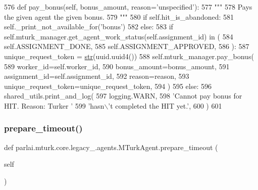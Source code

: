 \begin{DoxyCode}
576     \textcolor{keyword}{def }pay\_bonus(self, bonus\_amount, reason='unspecified'):
577         \textcolor{stringliteral}{"""}
578 \textcolor{stringliteral}{        Pays the given agent the given bonus.}
579 \textcolor{stringliteral}{        """}
580         \textcolor{keywordflow}{if} self.hit\_is\_abandoned:
581             self.\_print\_not\_available\_for(\textcolor{stringliteral}{'bonus'})
582         \textcolor{keywordflow}{else}:
583             \textcolor{keywordflow}{if} self.mturk\_manager.get\_agent\_work\_status(self.assignment\_id) \textcolor{keywordflow}{in} (
584                 self.ASSIGNMENT\_DONE,
585                 self.ASSIGNMENT\_APPROVED,
586             ):
587                 unique\_request\_token = \hyperlink{namespacegenerate__task__READMEs_a5b88452ffb87b78c8c85ececebafc09f}{str}(uuid.uuid4())
588                 self.mturk\_manager.pay\_bonus(
589                     worker\_id=self.worker\_id,
590                     bonus\_amount=bonus\_amount,
591                     assignment\_id=self.assignment\_id,
592                     reason=reason,
593                     unique\_request\_token=unique\_request\_token,
594                 )
595             \textcolor{keywordflow}{else}:
596                 shared\_utils.print\_and\_log(
597                     logging.WARN,
598                     \textcolor{stringliteral}{'Cannot pay bonus for HIT. Reason: Turker '}
599                     \textcolor{stringliteral}{'hasn\(\backslash\)'t completed the HIT yet.'},
600                 )
601 
\end{DoxyCode}
\mbox{\label{classparlai_1_1mturk_1_1core_1_1legacy__2018_1_1agents_1_1MTurkAgent_a8b3209004d4c83fdb11cacb82528e871}} 
\subsubsection{\texorpdfstring{prepare\+\_\+timeout()}{prepare\_timeout()}}
{\footnotesize\ttfamily def parlai.\+mturk.\+core.\+legacy\+\_.\+agents.\+M\+Turk\+Agent.\+prepare\+\_\+timeout (\begin{DoxyParamCaption}\item[{}]{self }\end{DoxyParamCaption})}

